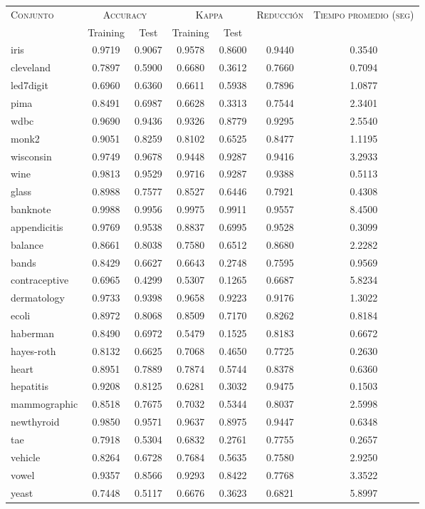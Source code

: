 \begin{table}[]
\centering
\begin{tabular}{l c c c c c c}
\hline
\multirow{2}{*}{\textsc{Conjunto}}
	& \multicolumn{2}{c}{\textsc{Accuracy}}
	& \multicolumn{2}{c}{\textsc{Kappa}}
	& \textsc{Reducción}
	& \textsc{Tiempo promedio (seg)} \\
	& Training & Test
	& Training & Test \\ 
\hline
\hline

iris & 0.9719 & 0.9067 & 0.9578 & 0.8600 & 0.9440 & 0.3540 \\
cleveland & 0.7897 & 0.5900 & 0.6680 & 0.3612 & 0.7660 & 0.7094 \\
led7digit & 0.6960 & 0.6360 & 0.6611 & 0.5938 & 0.7896 & 1.0877 \\
pima & 0.8491 & 0.6987 & 0.6628 & 0.3313 & 0.7544 & 2.3401 \\
wdbc & 0.9690 & 0.9436 & 0.9326 & 0.8779 & 0.9295 & 2.5540 \\
monk2 & 0.9051 & 0.8259 & 0.8102 & 0.6525 & 0.8477 & 1.1195 \\
wisconsin & 0.9749 & 0.9678 & 0.9448 & 0.9287 & 0.9416 & 3.2933 \\
wine & 0.9813 & 0.9529 & 0.9716 & 0.9287 & 0.9388 & 0.5113 \\
glass & 0.8988 & 0.7577 & 0.8527 & 0.6446 & 0.7921 & 0.4308 \\
banknote & 0.9988 & 0.9956 & 0.9975 & 0.9911 & 0.9557 & 8.4500 \\
appendicitis & 0.9769 & 0.9538 & 0.8837 & 0.6995 & 0.9528 & 0.3099 \\
balance & 0.8661 & 0.8038 & 0.7580 & 0.6512 & 0.8680 & 2.2282 \\
bands & 0.8429 & 0.6627 & 0.6643 & 0.2748 & 0.7595 & 0.9569 \\
contraceptive & 0.6965 & 0.4299 & 0.5307 & 0.1265 & 0.6687 & 5.8234 \\
dermatology & 0.9733 & 0.9398 & 0.9658 & 0.9223 & 0.9176 & 1.3022 \\
ecoli & 0.8972 & 0.8068 & 0.8509 & 0.7170 & 0.8262 & 0.8184 \\
haberman & 0.8490 & 0.6972 & 0.5479 & 0.1525 & 0.8183 & 0.6672 \\
hayes-roth & 0.8132 & 0.6625 & 0.7068 & 0.4650 & 0.7725 & 0.2630 \\
heart & 0.8951 & 0.7889 & 0.7874 & 0.5744 & 0.8378 & 0.6360 \\
hepatitis & 0.9208 & 0.8125 & 0.6281 & 0.3032 & 0.9475 & 0.1503 \\
mammographic & 0.8518 & 0.7675 & 0.7032 & 0.5344 & 0.8037 & 2.5998 \\
newthyroid & 0.9850 & 0.9571 & 0.9637 & 0.8975 & 0.9447 & 0.6348 \\
tae & 0.7918 & 0.5304 & 0.6832 & 0.2761 & 0.7755 & 0.2657 \\
vehicle & 0.8264 & 0.6728 & 0.7684 & 0.5635 & 0.7580 & 2.9250 \\
vowel & 0.9357 & 0.8566 & 0.9293 & 0.8422 & 0.7768 & 3.3522 \\
yeast & 0.7448 & 0.5117 & 0.6676 & 0.3623 & 0.6821 & 5.8997 \\


\end{tabular}
\end{table}

